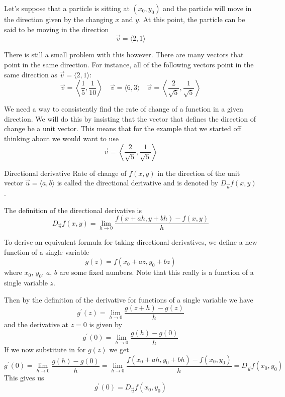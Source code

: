 Let's suppose that a particle is sitting at $(x_0,y_0)$ and the particle will move in the direction given by the changing 
$x$ and $y$. At this point, the particle can be said to be moving in the direction
\[ \vec{v} = \langle {2,1} \rangle \]

There is still a small problem with this however. There are many vectors that point in the same direction. For instance, all of the following vectors point in the same direction as $\vec v = \langle {2,1} \rangle$:
\[ \vec{v} = \left\langle {\frac{1}{5},\frac{1}{10}}\right\rangle \quad \vec{v} = \langle {6,3}\rangle \quad \vec{v} = \left\langle {\frac{2}{\sqrt{5}},\frac{1}{\sqrt{5}}}\right\rangle \]

We need a way to consistently find the rate of change of a function in a given direction. We will do this by insisting that the vector that defines the direction of change be a unit vector. This means that for the example that we started off thinking about we would want to use
\[ \vec{v} = \left\langle {\frac{2}{\sqrt{5}},\frac{1}{\sqrt{5}}}\right\rangle \]

\begin{defn}{Directional derivative}{}
Rate of change of $f(x,y)$ in the direction of the unit vector $\vec{u}=\langle{a,b}\rangle$ is called the directional derivative and is denoted by $D_{\vec{u}} f(x,y)$.

The definition of the directional derivative is
\begin{equation}
{D_{\vec u}}f(x,y) = \lim_{h\to0} \frac{f(x + ah,y + bh) - f(x,y)}{h}
\end{equation}
\end{defn}

To derive an equivalent formula for taking directional derivatives, we define a new function of a single variable
\[ g(z) = f(x_0+az,y_0+bz) \]
where $x_0$, $y_0$, $a$, $b$ are some fixed numbers. Note that this really is a function of a single variable $z$.

Then by the definition of the derivative for functions of a single variable we have
\[ g^\prime(z) = \lim_{h\to0} \frac{g(z+h)-g(z)}{h} \]
and the derivative at $z=0$ is given by
\[ g^\prime(0) = \lim_{h\to0} \frac{g(h)-g(0)}{h} \]
If we now substitute in for $g(z)$ we get
\[ g^\prime(0) = \lim_{h\to0} \frac{g(h)-g(0)}{h} = \lim_{h\to0} \frac{f(x_0+ah,y_0+bh) - f(x_0,y_0)}{h} = D_{\vec u}f(x_0,y_0) \]
This gives us
\begin{equation}\tag{1}
g^\prime(0) = D_{\vec u}f(x_0,y_0)
\end{equation}

